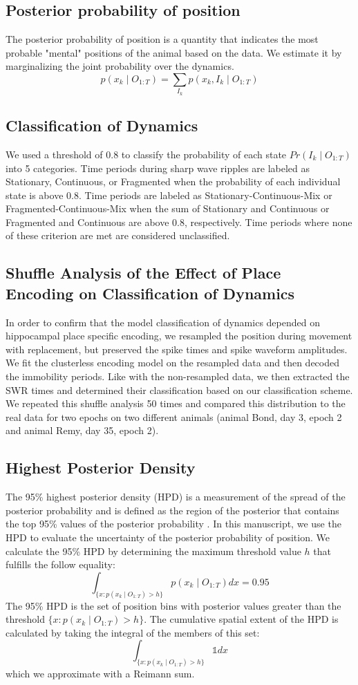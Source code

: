 \documentclass[times, twoside]{zHenriquesLab-StyleBioRxiv}
\begin{document}
\subsection*{Posterior probability of position}
The posterior probability of position is a quantity that indicates the most probable "mental" positions of the animal based on the data. We estimate it by marginalizing the joint probability over the dynamics.
$$p(x_{k} \mid O_{1:T}) = \sum_{I_{k}} p(x_{k}, I_{k} \mid O_{1:T})$$

\subsection*{Classification of Dynamics}
We used a threshold of 0.8 to classify the probability of each state $Pr(I_{k} \mid O_{1:T})$ into 5 categories. Time periods during sharp wave ripples are labeled as Stationary, Continuous, or Fragmented when the probability of each individual state is above 0.8. Time periods are labeled as Stationary-Continuous-Mix or Fragmented-Continuous-Mix when the sum of Stationary and Continuous or Fragmented and Continuous are above 0.8, respectively. Time periods where none of these criterion are met are considered unclassified.

\subsection*{Shuffle Analysis of the Effect of Place Encoding on Classification of Dynamics}
In order to confirm that the model classification of dynamics depended on hippocampal place specific encoding, we resampled the position during movement with replacement, but preserved the spike times and spike waveform amplitudes. We fit the clusterless encoding model on the resampled data and then decoded the immobility periods. Like with the non-resampled data, we then extracted the SWR times and determined their classification based on our classification scheme. We repeated this shuffle analysis 50 times and compared this distribution to the real data for two epochs on two different animals (animal Bond, day 3, epoch 2 and animal Remy, day 35, epoch 2).

\subsection*{Highest Posterior Density}
The 95\% highest posterior density (HPD) is a measurement of the spread of the posterior probability and is defined as the region of the posterior that contains the top 95\% values of the posterior probability \cite{CasellaStatisticalinference2001}. In this manuscript, we use the HPD to evaluate the uncertainty of the posterior probability of position. We calculate the 95\% HPD by determining the maximum threshold value $h$ that fulfills the follow equality:
$$
\int_{\{x: p(x_{k} \mid O_{1:T}) > h\}} p(x_{k} \mid O_{1:T})dx = 0.95
$$
The 95\% HPD is the set of position bins with posterior values greater than the threshold $\{x : p(x_{k} \mid O_{1:T}) > h\}$. The cumulative spatial extent of the HPD is calculated by taking the integral of the members of this set:
$$
\int_{\{x: p(x_{k} \mid O_{1:T}) > h\}} \mathbb{1}dx
$$
which we approximate with a Reimann sum.
\end{document}
